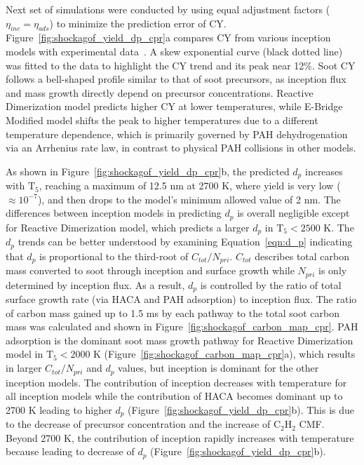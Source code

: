 Next set of simulations were conducted by using equal adjustment factors ($\eta_{inc}=\eta_{ads}$) to minimize the prediction error of CY. Figure~\ref{fig:shockagof_yield_dp_cpr}a compares CY from various inception models with experimental data~\citep{agafonov2016unified}. A skew exponential curve (black dotted line) was fitted to the data to highlight the CY trend and its peak near 12\%. Soot CY follows a bell-shaped profile similar to that of soot precursors, as inception flux and mass growth directly depend on precursor concentrations. Reactive Dimerization model predicts higher CY at lower temperatures, while E-Bridge Modified model shifts the peak to higher temperatures due to a different temperature dependence, which is primarily governed by PAH dehydrogenation via an Arrhenius rate law, in contrast to physical PAH collisions in other models. 


As shown in Figure~\ref{fig:shockagof_yield_dp_cpr}b, the predicted $d_p$ increases with $\mathrm{T_5}$, reaching a maximum of 12.5 nm at 2700 K, where yield is very low ($\approx 10^{-7}$), and then drops to the model's minimum allowed value of 2 nm. The differences between inception models in predicting $d_p$ is overall negligible except for Reactive Dimerization model, which predicts a larger $d_p$ in $\mathrm{T_5}<2500$ K. The $d_p$ trends can be better understood by examining Equation~\eqref{eqn:d_p} indicating that $d_p$ is proportional to the third-root of $C_{tot}/N_{pri}$. $C_{tot}$ describes total carbon mass converted to soot through inception and surface growth while $N_{pri}$ is only determined by inception flux. As a result, $d_p$ is controlled by the ratio of total surface growth rate (via HACA and PAH adsorption) to inception flux. The ratio of carbon mass gained up to 1.5 ms by each pathway to the total soot carbon mass was calculated and shown in Figure~\ref{fig:shockagof_carbon_map_cpr}. PAH adsorption is the dominant soot mass growth pathway for Reactive Dimerization model in $\mathrm{T_5}<2000$ K (Figure~\ref{fig:shockagof_carbon_map_cpr}a), which results in larger $C_{tot}/N_{pri}$ and $d_p$ values, but inception is dominant for the other inception models. The contribution of inception decreases with temperature for all inception models while the contribution of HACA becomes dominant up to 2700 K leading to higher $d_p$ (Figure~\ref{fig:shockagof_yield_dp_cpr}b). This is due to the decrease of precursor concentration and the increase of $\mathrm{C_2H_2}$ CMF. Beyond 2700 K, the contribution of inception rapidly increases with temperature because leading to decrease of $d_p$ (Figure~\ref{fig:shockagof_yield_dp_cpr}b).


